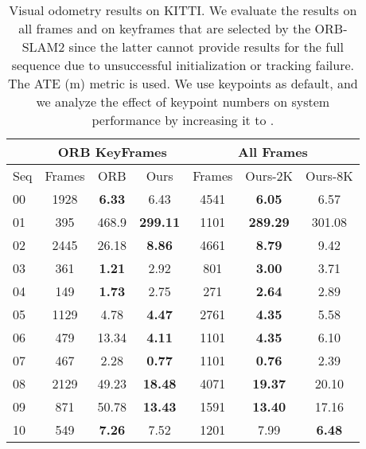 \documentclass[twocolumn]{svjour3}
\begin{document}
\begin{table}[t]
  \setlength{\tabcolsep}{0.5mm}
  \caption{Visual odometry results on KITTI. We evaluate the results on all frames and on keyframes that are selected by the ORB-SLAM2 since the latter cannot provide results for the full sequence due to unsuccessful initialization or tracking failure. The ATE (m) metric is used. We use  keypoints as default, and we analyze the effect of keypoint numbers on system performance by increasing it to . 
  }\label{tab:vo_orb}
  \centering
  \begin{tabular}{| l | c | c | c | c | c | c |}
    \cline{2-7}
    \multicolumn{1}{c|}{} & \multicolumn{3}{c|}{ORB KeyFrames} & \multicolumn{3}{c|}{All Frames} \\
    \hline
    Seq & Frames & ORB & Ours & Frames & Ours-2K & Ours-8K \\
    \hline
    00 & 1928 & \textbf{6.33} & 6.43 & 4541 & \textbf{6.05} & 6.57 \\
    \hline
    01 & 395 & 468.9 & \textbf{299.11} & 1101 & \textbf{289.29} & 301.08 \\
    \hline
    02 & 2445 & 26.18 & \textbf{8.86}  & 4661 & \textbf{8.79} & 9.42 \\
    \hline
    03 & 361 & \textbf{1.21} & 2.92 & 801 & \textbf{3.00} & 3.71 \\
    \hline
    04 & 149 & \textbf{1.73} & 2.75 & 271 & \textbf{2.64} & 2.89 \\
    \hline
    05 & 1129 & 4.78 & \textbf{4.47} & 2761 & \textbf{4.35} & 5.58 \\
    \hline
    06 & 479 & 13.34 & \textbf{4.11} & 1101 & \textbf{4.35} & 6.10 \\
    \hline    
    07 & 467 & 2.28 & \textbf{0.77} & 1101 & \textbf{0.76} & 2.39 \\
    \hline    
    08 & 2129 & 49.23 & \textbf{18.48} & 4071 & \textbf{19.37} & 20.10 \\
    \hline
    09 & 871 & 50.78 & \textbf{13.43} & 1591 & \textbf{13.40} & 17.16 \\
    \hline    
    10 & 549 & \textbf{7.26} & 7.52 & 1201 & 7.99 & \textbf{6.48}\\
    \hline
  \end{tabular}
\end{table}
\end{document}
